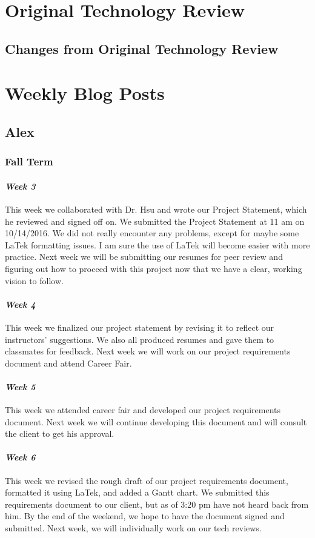 \documentclass[onecolumn, draftclsnofoot,10pt, compsoc]{IEEEtran}
\begin{document}
\section{Original Technology Review}

\subsection{Changes from Original Technology Review}

\section{Weekly Blog Posts}
\subsection{Alex}
\subsubsection{Fall Term}
\paragraph{\emph{Week 3}}
This week we collaborated with Dr. Hsu and wrote our Project Statement, which he reviewed and signed off on. We submitted the Project Statement at 11 am on 10/14/2016. We did not really encounter any problems, except for maybe some LaTek formatting issues. I am sure the use of LaTek will become easier with more practice. Next week we will be submitting our resumes for peer review and figuring out how to proceed with this project now that we have a clear, working vision to follow.
\paragraph{\emph{Week 4}}
This week we finalized our project statement by revising it to reflect our instructors' suggestions. We also all produced resumes and gave them to classmates for feedback. Next week we will work on our project requirements document and attend Career Fair.
\paragraph{\emph{Week 5}}
This week we attended career fair and developed our project requirements document. Next week we will continue developing this document and will consult the client to get his approval.
\paragraph{\emph{Week 6}}
This week we revised the rough draft of our project requirements document, formatted it using LaTek, and added a Gantt chart. We submitted this requirements document to our client, but as of 3:20 pm have not heard back from him. By the end of the weekend, we hope to have the document signed and submitted. Next week, we will individually work on our tech reviews.
\end{document}
